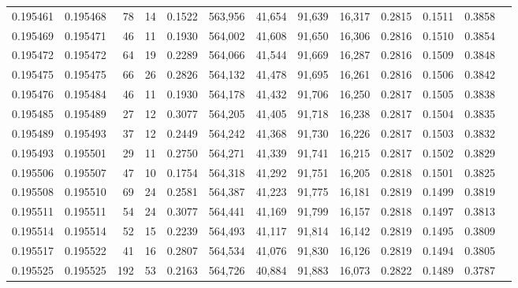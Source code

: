 \begin{tabular}{rrrrrrrrrrrrr}
0.195461 & 0.195468 &    78 &  14 &                                     0.1522 & 563,956 &  41,654 &  91,639 &  16,317 & 0.2815 & 0.1511 & 0.3858 \\
0.195469 & 0.195471 &    46 &  11 &                                     0.1930 & 564,002 &  41,608 &  91,650 &  16,306 & 0.2816 & 0.1510 & 0.3854 \\
0.195472 & 0.195472 &    64 &  19 &                                     0.2289 & 564,066 &  41,544 &  91,669 &  16,287 & 0.2816 & 0.1509 & 0.3848 \\
0.195475 & 0.195475 &    66 &  26 &                                     0.2826 & 564,132 &  41,478 &  91,695 &  16,261 & 0.2816 & 0.1506 & 0.3842 \\
0.195476 & 0.195484 &    46 &  11 &                                     0.1930 & 564,178 &  41,432 &  91,706 &  16,250 & 0.2817 & 0.1505 & 0.3838 \\
0.195485 & 0.195489 &    27 &  12 &                                     0.3077 & 564,205 &  41,405 &  91,718 &  16,238 & 0.2817 & 0.1504 & 0.3835 \\
0.195489 & 0.195493 &    37 &  12 &                                     0.2449 & 564,242 &  41,368 &  91,730 &  16,226 & 0.2817 & 0.1503 & 0.3832 \\
0.195493 & 0.195501 &    29 &  11 &                                     0.2750 & 564,271 &  41,339 &  91,741 &  16,215 & 0.2817 & 0.1502 & 0.3829 \\
0.195506 & 0.195507 &    47 &  10 &                                     0.1754 & 564,318 &  41,292 &  91,751 &  16,205 & 0.2818 & 0.1501 & 0.3825 \\
0.195508 & 0.195510 &    69 &  24 &                                     0.2581 & 564,387 &  41,223 &  91,775 &  16,181 & 0.2819 & 0.1499 & 0.3819 \\
0.195511 & 0.195511 &    54 &  24 &                                     0.3077 & 564,441 &  41,169 &  91,799 &  16,157 & 0.2818 & 0.1497 & 0.3813 \\
0.195514 & 0.195514 &    52 &  15 &                                     0.2239 & 564,493 &  41,117 &  91,814 &  16,142 & 0.2819 & 0.1495 & 0.3809 \\
0.195517 & 0.195522 &    41 &  16 &                                     0.2807 & 564,534 &  41,076 &  91,830 &  16,126 & 0.2819 & 0.1494 & 0.3805 \\
0.195525 & 0.195525 &   192 &  53 &                                     0.2163 & 564,726 &  40,884 &  91,883 &  16,073 & 0.2822 & 0.1489 & 0.3787 \\

\end{tabular}

